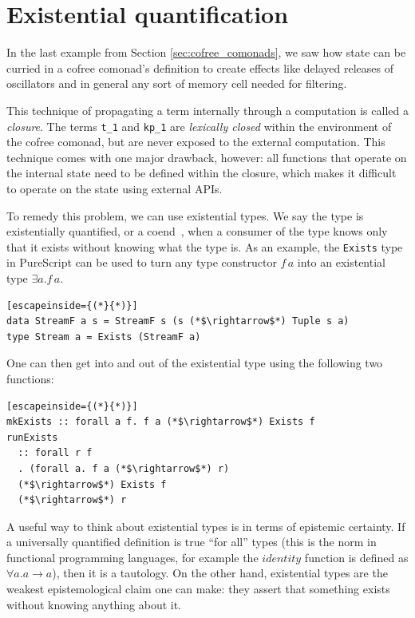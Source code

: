 \documentclass{article}
\begin{document}
\section{Existential quantification}
\label{sec:existential_quantification}

In the last example from Section \ref{sec:cofree_comonads}, we saw how state can be curried in a cofree comonad's definition to create effects like delayed releases of oscillators and in general any sort of memory cell needed for filtering.

This technique of propagating a term internally through a computation is called a \textit{closure}. The terms \texttt{t\_1} and \texttt{kp\_1} are \textit{lexically closed} within the environment of the cofree comonad, but are never exposed to the external computation.  This technique comes with one major drawback, however: all functions that operate on the internal state need to be defined within the closure, which makes it difficult to operate on the state using external APIs.

To remedy this problem, we can use existential types. We say the type is existentially quantified, or a coend~\cite{yoneda1960ext}, when a consumer of the type knows only that it exists without knowing what the type is. As an example, the \texttt{Exists} type in PureScript can be used to turn any type constructor $f\,a$ into an existential type $\exists a. f\,a$.

\lstset{language=Haskell, style=psstyle}
\begin{lstlisting}[escapeinside={(*}{*)}]
data StreamF a s = StreamF s (s (*$\rightarrow$*) Tuple s a)
type Stream a = Exists (StreamF a)
\end{lstlisting}

One can then get into and out of the existential type using the following two functions:

\lstset{language=Haskell, style=psstyle}
\begin{lstlisting}[escapeinside={(*}{*)}]
mkExists :: forall a f. f a (*$\rightarrow$*) Exists f
runExists
  :: forall r f
  . (forall a. f a (*$\rightarrow$*) r)
  (*$\rightarrow$*) Exists f
  (*$\rightarrow$*) r
\end{lstlisting}

A useful way to think about existential types is in terms of epistemic certainty. If a universally quantified definition is true ``for all'' types (this is the norm in functional programming languages, for example the $identity$ function is defined as $\forall a. a \rightarrow a$), then it is a tautology. On the other hand, existential types are the weakest epistemological claim one can make: they assert that something exists without knowing anything about it.
\end{document}
